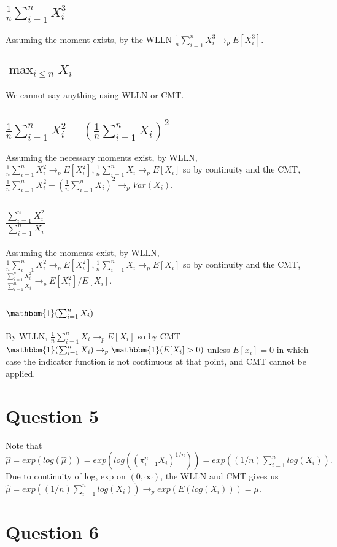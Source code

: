 \documentclass[11pt]{article} %
\begin{document}
\subsection{$\frac{1}{n}\sum_{i=1}^n X_i^3$}
Assuming the moment exists, by the WLLN $\frac{1}{n}\sum_{i=1}^n X_i^3 \rightarrow_p E[X_i^3]$.
\subsection{$\max_{i\leq n}X_i$ }
We cannot say anything using WLLN or CMT. %
\subsection{$\frac{1}{n}\sum_{i=1}^n X_i^2 - (\frac{1}{n}\sum_{i=1}^n X_i)^2$}
Assuming the necessary moments exist, by WLLN, $\frac{1}{n}\sum_{i=1}^n X_i^2 \rightarrow_p E[X_i^2], \frac{1}{n}\sum_{i=1}^n X_i \rightarrow_p E[X_i]$ so by continuity and the CMT, $\frac{1}{n}\sum_{i=1}^n X_i^2 - (\frac{1}{n}\sum_{i=1}^n X_i)^2 \rightarrow_p Var(X_i)$.
\subsection{$\frac{\sum_{i=1}^n X_i^2 }{\sum_{i=1}^n X_i }$}
Assuming the moments exist, by WLLN, $\frac{1}{n}\sum_{i=1}^n X_i^2 \rightarrow_p E[X_i^2], \frac{1}{n}\sum_{i=1}^n X_i \rightarrow_p E[X_i]$ so by continuity and the CMT,  $\frac{\sum_{i=1}^n X_i^2 }{\sum_{i=1}^n X_i }\rightarrow_p E[X_i^2]/E[X_i]. $
\subsection{$\mathbbm{1}(\sum_{i=1}^n X_i )$}
By WLLN, $ \frac{1}{n}\sum_{i=1}^n X_i \rightarrow_p E[X_i]$ so by CMT $\mathbbm{1}(\sum_{i=1}^n X_i ) \rightarrow_p \mathbbm{1}(E[X_i]>0) $ unless $E[x_i]=0$ in which case the indicator function is not continuous at that point, and CMT cannot be applied.
\section{Question 5}
Note that $\hat{\mu} = exp(log(\hat{\mu})) = exp(log((\pi_{i=1}^n X_i)^{1/n})) = exp((1/n)\sum_{i=1}^nlog(X_i)).$ Due to continuity of log, exp on $(0,\infty)$, the WLLN and CMT gives us $\hat{\mu} =  exp((1/n)\sum_{i=1}^nlog(X_i)) \rightarrow_p exp(E(log(X_i))) = \mu$.
\section{Question 6}
\end{document}

